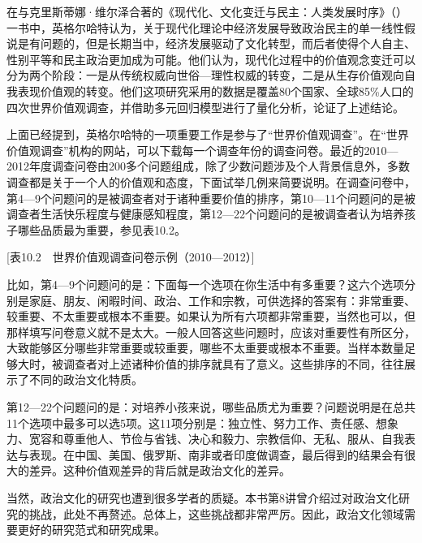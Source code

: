 在与克里斯蒂娜·维尔泽合著的《现代化、文化变迁与民主：人类发展时序》（）一书中，英格尔哈特认为，关于现代化理论中经济发展导致政治民主的单一线性假说是有问题的，但是长期当中，经济发展驱动了文化转型，而后者使得个人自主、性别平等和民主政治更加成为可能。他们认为，现代化过程中的价值观念变迁可以分为两个阶段：一是从传统权威向世俗—理性权威的转变，二是从生存价值观向自我表现价值观的转变。他们这项研究采用的数据是覆盖80个国家、全球85\%人口的四次世界价值观调查，并借助多元回归模型进行了量化分析，论证了上述结论。

上面已经提到，英格尔哈特的一项重要工作是参与了“世界价值观调查”。在“世界价值观调查”机构的网站，可以下载每一个调查年份的调查问卷。最近的2010—2012年度调查问卷由200多个问题组成，除了少数问题涉及个人背景信息外，多数调查都是关于一个人的价值观和态度，下面试举几例来简要说明。在调查问卷中，第4—9个问题问的是被调查者对于诸种重要价值的排序，第10—11个问题问的是被调查者生活快乐程度与健康感知程度，第12—22个问题问的是被调查者认为培养孩子哪些品质最为重要，参见表10.2。

[表10.2　世界价值观调查问卷示例（2010—2012）]


比如，第4—9个问题问的是：下面每一个选项在你生活中有多重要？这六个选项分别是家庭、朋友、闲暇时间、政治、工作和宗教，可供选择的答案有：非常重要、较重要、不太重要或根本不重要。如果认为所有六项都非常重要，当然也可以，但那样填写问卷意义就不是太大。一般人回答这些问题时，应该对重要性有所区分，大致能够区分哪些非常重要或较重要，哪些不太重要或根本不重要。当样本数量足够大时，被调查者对上述诸种价值的排序就具有了意义。这些排序的不同，往往展示了不同的政治文化特质。

第12—22个问题问的是：对培养小孩来说，哪些品质尤为重要？问题说明是在总共11个选项中最多可以选5项。这11项分别是：独立性、努力工作、责任感、想象力、宽容和尊重他人、节俭与省钱、决心和毅力、宗教信仰、无私、服从、自我表达与表现。在中国、美国、俄罗斯、南非或者印度做调查，最后得到的结果会有很大的差异。这种价值观差异的背后就是政治文化的差异。

当然，政治文化的研究也遭到很多学者的质疑。本书第8讲曾介绍过对政治文化研究的挑战，此处不再赘述。总体上，这些挑战都非常严厉。因此，政治文化领域需要更好的研究范式和研究成果。

